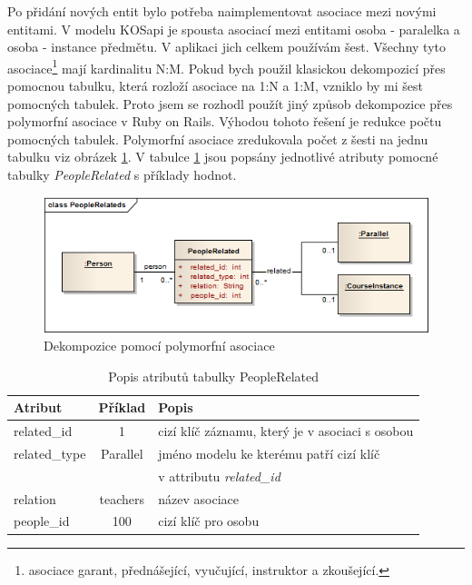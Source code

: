 Po přidání nových entit bylo potřeba naimplementovat asociace mezi novými entitami. V modelu KOSapi je spousta asociací mezi entitami osoba - paralelka a osoba - instance předmětu. V aplikaci jich celkem používám šest. Všechny tyto asociace\footnote{asociace garant, přednášející, vyučující, instruktor a zkoušející.} mají kardinalitu N:M. Pokud bych použil klasickou dekompozicí přes pomocnou tabulku, která rozloží asociace na 1:N a 1:M, vzniklo by mi šest pomocných tabulek. Proto jsem se rozhodl použít jiný způsob dekompozice přes polymorfní asociace \cite{guide_pa} v Ruby on Rails. Výhodou tohoto řešení je redukce počtu pomocných tabulek. Polymorfní asociace zredukovala počet z šesti na jednu tabulku viz obrázek \ref{fig:polymorfni}. V tabulce \ref{tab:people_related} jsou popsány jednotlivé atributy pomocné tabulky \textit{PeopleRelated} s příklady hodnot.

\begin{figure}[h]
\begin{center}
\includegraphics[width=12cm]{figures/PeopleRelateds}
\caption{Dekompozice pomocí polymorfní asociace}
\label{fig:polymorfni}
\end{center}
\end{figure}

\begin{table}[h]
\begin{center}
\begin{tabular}{|l|c|l|}

\hline
\textbf{Atribut} & \textbf{Příklad} & \textbf{Popis} \\ \hline
related\_id & 1 & cizí klíč záznamu, který je v asociaci s osobou \\\hline
related\_type & Parallel & jméno modelu ke kterému patří cizí klíč \\ & & v attributu \textit{related\_id} \\ \hline
relation & teachers & název asociace \\\hline
people\_id & 100 & cizí klíč pro osobu  \\\hline

\end{tabular}
\caption{Popis atributů tabulky PeopleRelated}
\label{tab:people_related}
\end{center}
\end{table}


